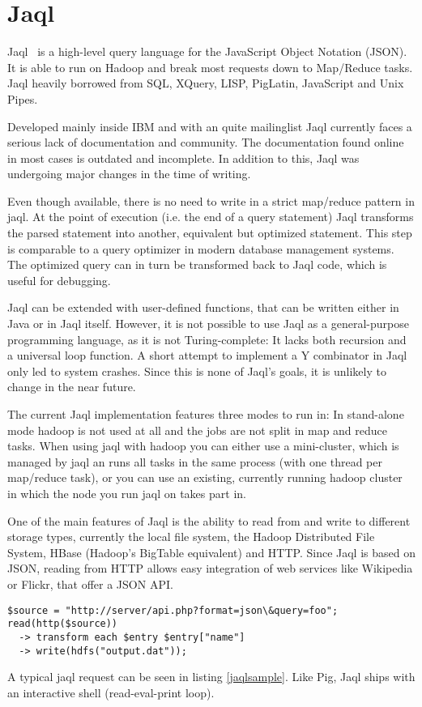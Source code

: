 \section{Jaql}

Jaql~\cite{jaqlWebsite} is a high-level query language for the JavaScript Object Notation (JSON).
It is able to run on Hadoop and break most requests down to Map/Reduce tasks.
Jaql heavily borrowed from SQL, XQuery, LISP, PigLatin, JavaScript and Unix Pipes.~\cite{jaqlOverview}

Developed mainly inside IBM and with an quite mailinglist Jaql currently faces
a serious lack of documentation and community. The documentation found online in
most cases is outdated and incomplete. In addition to this, Jaql was undergoing
major changes in the time of writing.

Even though available, there is no need to write in a strict map/reduce pattern in
jaql. At the point of execution (i.e. the end of a query statement) Jaql transforms the
parsed statement into another, equivalent but optimized statement. This step is
comparable to a query optimizer in modern database management systems. The optimized
query can in turn be transformed back to Jaql code, which is useful for debugging.

Jaql can be extended with user-defined functions, that can be written either in Java or
in Jaql itself. However, it is not possible to use Jaql as a general-purpose programming
language, as it is not Turing-complete: It lacks both recursion and a universal loop
function. A short attempt to implement a Y combinator in Jaql only led to system crashes.
Since this is none of Jaql's goals, it is unlikely to change in the near future.

The current Jaql implementation features three modes to run in: In stand-alone mode hadoop
is not used at all and the jobs are not split in map and reduce tasks. When using jaql
with hadoop you can either use a mini-cluster, which is managed by jaql an runs all tasks
in the same process (with one thread per map/reduce task), or you can use an existing,
currently running hadoop cluster in which the node you run jaql on takes part in.

One of the main features of Jaql is the ability to read from and write to different
storage types, currently the local file system, the Hadoop Distributed File System,
HBase (Hadoop's BigTable equivalent) and HTTP. Since Jaql is based on JSON, reading
from HTTP allows easy integration of web services like Wikipedia or Flickr, that offer
a JSON API.

\begin{lstlisting}[language=jaql,caption=A sample Jaql query,float,label=jaqlsample]
$source = "http://server/api.php?format=json\&query=foo";
read(http($source)) 
  -> transform each $entry $entry["name"]
  -> write(hdfs("output.dat"));
\end{lstlisting}

A typical jaql request can be seen in listing \ref{jaqlsample}. Like Pig, Jaql ships with an
interactive shell (read-eval-print loop). 